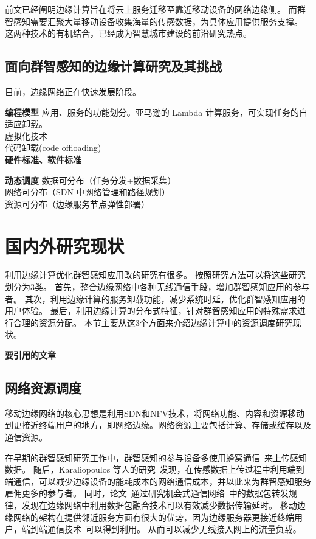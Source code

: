 前文已经阐明边缘计算旨在将云上服务迁移至靠近移动设备的网络边缘侧。
而群智感知需要汇聚大量移动设备收集海量的传感数据，为具体应用提供服务支撑。
这两种技术的有机结合，已经成为智慧城市建设的前沿研究热点。

\subsection{面向群智感知的边缘计算研究及其挑战}
目前，边缘网络正在快速发展阶段。


\textbf{编程模型}
应用、服务的功能划分。亚马逊的 Lambda 计算服务，可实现任务的自适应卸载。\\
虚拟化技术\\
代码卸载(code offloading)\\

\textbf{硬件标准、软件标准}

\textbf{动态调度}
数据可分布（任务分发+数据采集）\\
网络可分布（SDN 中网络管理和路径规划）\\
资源可分布（边缘服务节点弹性部署）\\

\section{国内外研究现状}

利用边缘计算优化群智感知应用改的研究有很多。
按照研究方法可以将这些研究划分为3类。
首先，整合边缘网络中各种无线通信手段，增加群智感知应用的参与者。
其次，利用边缘计算的服务卸载功能，减少系统时延，优化群智感知应用的用户体验。
最后，利用边缘计算的分布式特征，针对群智感知应用的特殊需求进行合理的资源分配。
本节主要从这3个方面来介绍边缘计算中的资源调度研究现状。

\textbf{要引用的文章}
\cite{DBLP:journals/jsac/LyuNTLWGP17}

\subsection{网络资源调度}

移动边缘网络的核心思想是利用SDN和NFV技术，将网络功能、内容和资源移动到更接近终端用户的地方，即网络边缘。网络资源主要包括计算、存储或缓存以及通信资源。

在早期的群智感知研究工作中，群智感知的参与设备多使用蜂窝通信~\cite{DBLP:conf/globecom/ZhangJLLC16,DBLP:conf/icdcs/XiaoWHHH16}来上传感知数据。
随后，Karaliopoulos 等人的研究~\cite{DBLP:conf/infocom/KaraliopoulosTK15}发现，在传感数据上传过程中利用端到端通信，可以减少边缘设备的能耗成本的网络通信成本，并以此来为群智感知服务雇佣更多的参与者。
同时，论文~\cite{DBLP:journals/tpds/ZhaoMTL15}通过研究机会式通信网络~\cite{}中的数据包转发规律，发现在边缘网络中利用数据包融合技术可以有效减少数据传输延时。
移动边缘网络的架构在提供邻近服务方面有很大的优势，因为边缘服务器更接近终端用户，端到端通信技术~\cite{nunna2015enabling}可以得到利用。
从而可以减少无线接入网上的流量负载。


